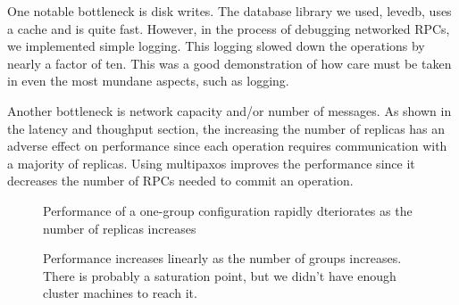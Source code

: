 \documentclass[letterpaper,10pt]{article}
\begin{document}
One notable bottleneck is disk writes. The database library we used,
levedb, uses a cache and is quite fast. However, in the process of
debugging networked RPCs, we implemented simple logging. This logging
slowed down the operations by nearly a factor of ten. This was a good
demonstration of how care must be taken in even the most mundane
aspects, such as logging.

Another bottleneck is network capacity and/or number of messages. As
shown in the latency and thoughput section, the increasing the number
of replicas has an adverse effect on performance since each operation
requires communication with a majority of replicas. Using multipaxos
improves the performance since it decreases the number of RPCs needed
to commit an operation. 


\begin{figure}[H]
\centering
{}
\caption{Performance of a one-group configuration rapidly dteriorates as the number of replicas increases}
\label{fig:replicas}
\end{figure}

\begin{figure}[H]
\centering
{}
\caption{Performance increases linearly as the number of groups increases. There is probably a saturation point, but we didn't have enough cluster machines to reach it.}
\label{fig:groups}
\end{figure}
\end{document}
